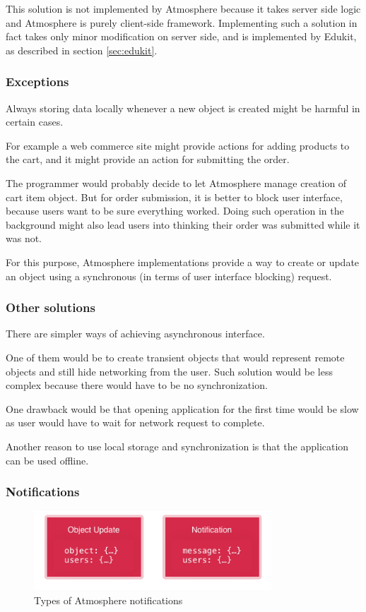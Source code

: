 This solution is not implemented by Atmosphere because it takes server side logic and Atmosphere is purely client-side framework. Implementing such a solution in fact takes only minor modification on server side, and is implemented by Edukit, as described in section \ref{sec:edukit}.

\subsubsection{Exceptions}

Always storing data locally whenever a new object is created might be harmful in certain cases.

For example a web commerce site might provide actions for adding products to the cart, and it might provide an action for submitting the order.

The programmer would probably decide to let Atmosphere manage creation of cart item object. But for order submission, it is better to block user interface, because users want to be sure everything worked. Doing such operation in the background might also lead users into thinking their order was submitted while it was not.

For this purpose, Atmosphere implementations provide a way to create or update an object using a synchronous (in terms of user interface blocking) request. 

\subsubsection{Other solutions}

There are simpler ways of achieving asynchronous interface.

One of them would be to create transient objects that would represent remote objects and still hide networking from the user. Such solution would be less complex because there would have to be no synchronization.

 One drawback would be that opening application for the first time would be slow as user would have to wait for network request to complete. 

Another reason to use local storage and synchronization is that the application can be used offline.

\subsubsection{Notifications}

\begin{figure}[htbp]
  \centering
    \includegraphics[width=3.5in]{figures/Notifications.png}
  \caption{Types of Atmosphere notifications}
  \label{fig:figures_NotificationServer}
\end{figure}


